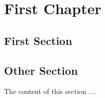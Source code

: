 
\chapter{First Chapter}

\section{First Section}


\section{Other Section}

The content of this section ....